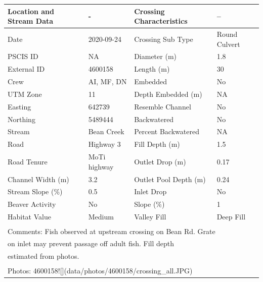 \documentclass[
]{book}
\begin{document}
\begin{tabular}{l|l|l|l}
\hline
Location and Stream Data & - & Crossing Characteristics & --\\
\hline
Date & 2020-09-24 & Crossing Sub Type & Round Culvert\\
\hline
PSCIS ID & NA & Diameter (m) & 1.8\\
\hline
External ID & 4600158 & Length (m) & 30\\
\hline
Crew & AI, MF, DN & Embedded & No\\
\hline
UTM Zone & 11 & Depth Embedded (m) & NA\\
\hline
Easting & 642739 & Resemble Channel & No\\
\hline
Northing & 5489444 & Backwatered & No\\
\hline
Stream & Bean Creek & Percent Backwatered & NA\\
\hline
Road & Highway 3 & Fill Depth (m) & 1.5\\
\hline
Road Tenure & MoTi highway & Outlet Drop (m) & 0.17\\
\hline
Channel Width (m) & 3.2 & Outlet Pool Depth (m) & 0.24\\
\hline
Stream Slope (\%) & 0.5 & Inlet Drop & No\\
\hline
Beaver Activity & No & Slope (\%) & 1\\
\hline
Habitat Value & Medium & Valley Fill & Deep Fill\\
\hline
\multicolumn{4}{l}{\textsuperscript{} Comments: Fish observed at upstream crossing on Bean Rd.  Grate}\\
\multicolumn{4}{l}{on inlet may prevent passage off adult fish.  Fill depth}\\
\multicolumn{4}{l}{estimated from photos.}\\
\multicolumn{4}{l}{\textsuperscript{} Photos: 4600158![](data/photos/4600158/crossing\_all.JPG)}\\
\end{tabular}
\end{document}
